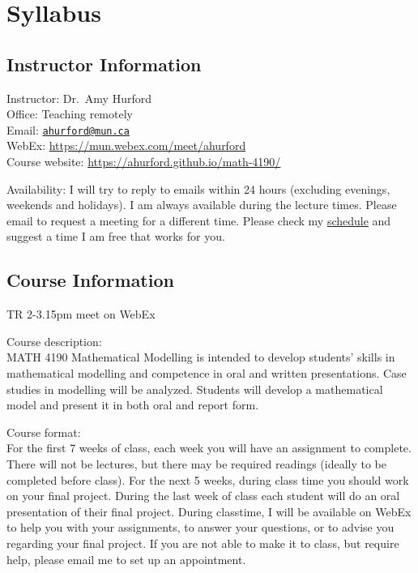 \documentclass[]{book}
\author{}
\date{\vspace{-2.5em}}
\begin{document}
{
\setcounter{tocdepth}{1}
\tableofcontents
}
\chapter{Syllabus}\label{syllabus}

\section{Instructor Information}\label{instructor-information}

Instructor: Dr.~Amy Hurford\\
Office: Teaching remotely\\
Email: \href{mailto:ahurford@mun.ca}{\nolinkurl{ahurford@mun.ca}}\\
WebEx: \url{https://mun.webex.com/meet/ahurford}\\
Course website: \url{https://ahurford.github.io/math-4190/}

Availability: I will try to reply to emails within 24 hours (excluding
evenings, weekends and holidays). I am always available during the
lecture times. Please email to request a meeting for a different time.
Please check my \href{https://amyhurford.weebly.com/}{schedule} and
suggest a time I am free that works for you.

\section{Course Information}\label{course-information}

TR 2-3.15pm meet on WebEx

Course description:\\
MATH 4190 Mathematical Modelling is intended to develop students' skills
in mathematical modelling and competence in oral and written
presentations. Case studies in modelling will be analyzed. Students will
develop a mathematical model and present it in both oral and report
form.

Course format:\\
For the first 7 weeks of class, each week you will have an assignment to
complete. There will not be lectures, but there may be required readings
(ideally to be completed before class). For the next 5 weeks, during
class time you should work on your final project. During the last week
of class each student will do an oral presentation of their final
project. During classtime, I will be available on WebEx to help you with
your assignments, to answer your questions, or to advise you regarding
your final project. If you are not able to make it to class, but require
help, please email me to set up an appointment.
\end{document}
